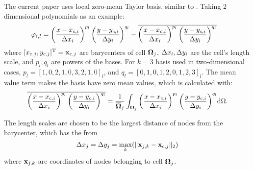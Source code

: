 \documentclass[preprint,12pt]{elsarticle}
\begin{document}
The current paper uses local zero-mean Taylor basis, similar to
\cite{wang2017compact_VR}.
Taking 2 dimensional polynomials as an example:
\begin{equation}
    \begin{aligned}
        \varphi_{i,l} & =
        \left(\frac{x - x_{c,i}}{\mathrm\Delta x_i}\right)^{p_l}
        \left(\frac{y - y_{c,i}}{\mathrm\Delta y_i}\right)^{q_l}
        -
        \overline{
            \left(\frac{x - x_{c,i}}{\mathrm\Delta x_i}\right)^{p_l}
            \left(\frac{y - y_{c,i}}{\mathrm\Delta y_i}\right)^{q_l}
        }
    \end{aligned}
\end{equation}
where $[x_{c,j},y_{c,j}]^\mathrm{T} = \mathbf{x}_{c,j}$ are barycenters of cell $\mathbf{\Omega}_{j}$,
$\mathrm\Delta x_i,\mathrm\Delta y_i$ are the cell's length scale, and $p_l,q_l$ are
powers of the bases. For $k=3$ basis used in two-dimensional cases, 
$p_l=[1,0,2,1,0,3,2,1,0]_l$,
and $q_l=[0,1,0,1,2,0,1,2,3]_l$.
The mean value term makes the basis have zero mean values, 
which is calculated with:
\begin{equation}
    \overline{
        \left(\frac{x - x_{c,i}}{\mathrm\Delta x_i}\right)^{p_l}
        \left(\frac{y - y_{c,i}}{\mathrm\Delta y_i}\right)^{q_l}
    }
    =
    \frac{1}{\overline{\mathbf{\Omega}}_j}\int_{\mathbf{\Omega}_j}{
        \left(\frac{x - x_{c,i}}{\mathrm\Delta x_i}\right)^{p_l}
        \left(\frac{y - y_{c,i}}{\mathrm\Delta y_i}\right)^{q_l}
    }\dd \Omega . 
\end{equation}

The length scales are chosen to be the largest distance of nodes from the
barycenter, which has the from
\begin{equation}
    \mathrm\Delta x_j = \mathrm\Delta y_j = \max_k(\|\mathbf{x}_{j,k} - \mathbf{x}_{c,j}\|_2)
\end{equation}
where $\mathbf{x}_{j,k}$ are coordinates of nodes belonging to cell $\mathbf{\Omega}_{j}$.
\end{document}
